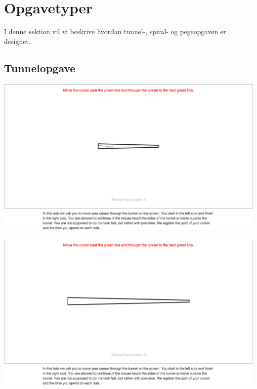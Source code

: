 \section*{Opgavetyper}
I denne sektion vil vi beskrive hvordan tunnel-, spiral- og pegeopgaven er designet.

\subsection*{Tunnelopgave}
\begin{minipage}{\textwidth}
	\begin{minipage}{.5\textwidth}
		\centering
		\includegraphics[width=\textwidth, trim = .5cm 20cm .5cm 15cm, clip]{images/screenshots/ex_step_4_tunnel_path}
		\label{fig:ex_tunnel_1}
	\end{minipage}
	\begin{minipage}{.5\textwidth}
		\centering
		\includegraphics[width=\textwidth, trim = .5cm 20cm .5cm 15cm, clip]{images/screenshots/ex_step_4_tunnel_2}

\end{minipage}
\end{minipage}
